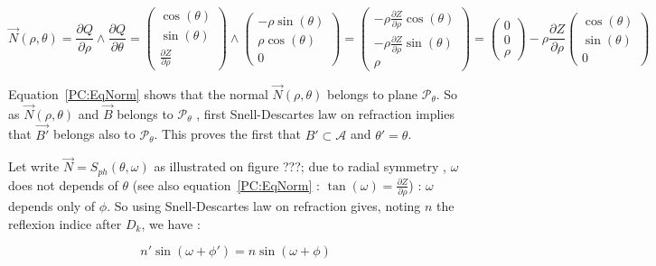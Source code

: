 \begin{equation}
	\vec{N}(\rho,\theta) 
	=  \frac{\partial Q}{\partial \rho} \wedge \frac{\partial Q}{\partial \theta}
	=   \begin{pmatrix} \cos(\theta)  \\  \sin(\theta)   \\    \frac{\partial Z}{\partial \rho}   \end{pmatrix}
            \wedge 
	   \begin{pmatrix} -\rho \sin(\theta)  \\ \rho \cos(\theta)   \\ 0 \end{pmatrix}
	=   \begin{pmatrix}  - \rho \frac{\partial Z}{\partial \rho}  \cos(\theta)  \\  -\rho \frac{\partial Z}{\partial \rho}  \sin(\theta)   \\  \rho     \end{pmatrix}
	=   \begin{pmatrix}  0 \\  0 \\  \rho     \end{pmatrix}
            - \rho \frac{\partial Z}{\partial \rho}   \begin{pmatrix}   \cos(\theta)  \\   \sin(\theta)   \\  0     \end{pmatrix}
		    \label{PC:EqNorm}
\end{equation}

Equation~\ref{PC:EqNorm} shows that the normal  $\vec{N}(\rho,\theta)$ belongs to plane $\mathcal{P}_{\theta}$. 
So as $\vec{N}(\rho,\theta)$ and $\vec{B}$  belongs to $\mathcal{P}_{\theta}$ , first Snell-Descartes law on refraction 
implies that  $\vec{B'}$ belongs also to  $\mathcal{P}_{\theta}$.  This proves the first
that $B' \subset  \mathcal{A}$ and $\theta'=\theta$.

Let write $\vec{N} = S_{ph}(\theta,\omega)$ as illustrated on  figure ???;  due to radial symmetry  ,
$\omega$ does not  depends of $\theta$ (see also equation~\ref{PC:EqNorm} : $\tan(\omega)= \frac{\partial Z}{\partial \rho}$) :  $\omega$  depends only of $\phi$.
So using Snell-Descartes law on refraction gives, noting $n$ the reflexion indice after $D_k$, we have :

\begin{equation}
	n'  \sin(\omega + \phi') = n  \sin(\omega + \phi)
\end{equation}

